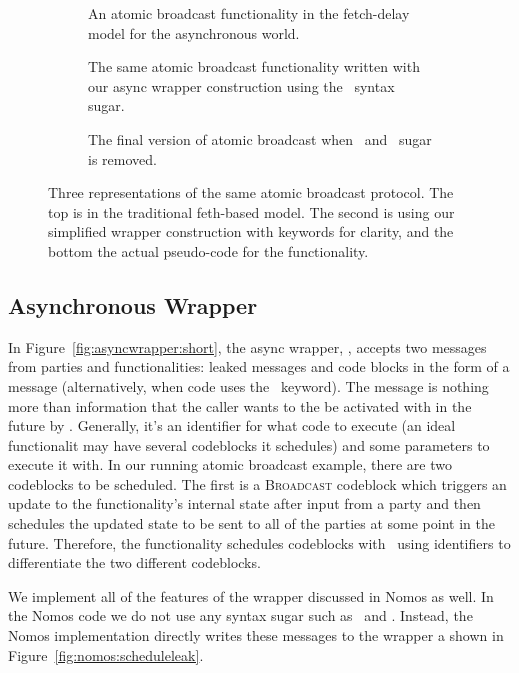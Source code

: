 \begin{figure}
\begin{subfigure}{\columnwidth}
	
	\caption{An atomic broadcast functionality in the fetch-delay model for the asynchronous world.}
	\label{fig:atomic:old}
\end{subfigure}
\begin{subfigure}{\columnwidth}
	
	\caption{The same atomic broadcast functionality written with our async wrapper construction using the \Eventually~syntax sugar.}
	\label{fig:atomic:new}
\end{subfigure}
\begin{subfigure}{\columnwidth}
	
	\caption{The final version of atomic broadcast when \Leak~and \Eventually~sugar is removed.}
	\label{fig:atomic:real}
\end{subfigure}
\caption{Three representations of the same atomic broadcast protocol. The top is in the traditional feth-based model. The second is using our simplified wrapper construction with keywords for clarity, and the bottom the actual pseudo-code for the functionality.}
\label{fig:fatomic}
\end{figure}

\subsection{Asynchronous Wrapper}
In Figure~\ref{fig:asyncwrapper:short}, the async wrapper, \Wasync, accepts two messages from parties and functionalities: leaked messages and code blocks in the form of a  message (alternatively, when code uses the \Eventually~keyword).
The  message is nothing more than information that the caller wants to the be activated with in the future by \Wasync.
Generally, it's an identifier for what code to execute (an ideal functionalit may have several codeblocks it schedules) and some parameters to execute it with.
In our running atomic broadcast example, there are two codeblocks to be scheduled.
The first is a \textsc{Broadcast} codeblock which triggers an update to the functionality's internal state after input from a party and then schedules the updated state to be sent to all of the parties at some point in the future.
Therefore, the functionality schedules codeblocks with \Wasync~using identifiers to differentiate the two different codeblocks.

We implement all of the features of the wrapper discussed in Nomos as well.
In the Nomos code we do not use any syntax sugar such as \Eventually~and \Leak.
Instead, the Nomos implementation directly writes these messages to the wrapper a shown in Figure~\ref{fig:nomos:scheduleleak}.

